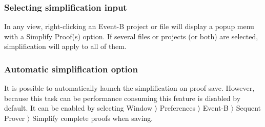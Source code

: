 \subsubsection{Selecting simplification input}
In any view, right-clicking an Event-B project or file will display a popup menu with a \textsf{Simplify Proof(s)} option. If several files or projects (or both) are selected, simplification will apply to all of them.

\subsubsection{Automatic simplification option}
It is possible to automatically launch the simplification on proof save. However, because this task can be performance consuming this feature is disabled by default. It can be enabled by selecting \textsf{Window} $ \rangle $ \textsf{Preferences} $ \rangle $ \textsf{Event-B} $ \rangle $ \textsf{Sequent Prover} $ \rangle $ \textsf{Simplify complete proofs when saving}.

